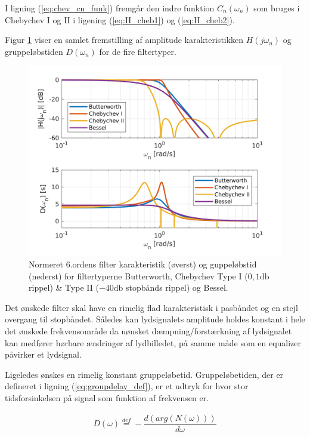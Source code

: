 I ligning (\ref{eq:chev_cn_funk}) fremgår den indre funktion $C_n(\omega_n)$ som bruges i Chebychev I og II i ligening (\ref{eq:H_cheb1}) og (\ref{eq:H_cheb2}).

Figur \ref{fig:filter_typer} viser en samlet fremstilling af amplitude karakteristikken $H(j\omega_n)$ og gruppeløbstiden $D(\omega_n)$ for de fire filtertyper.

\begin{figure}[h!]
	\centering
	\includegraphics[width=1\textwidth]{matlab/filter_compare.png}
	\caption{Normeret 6.ordens filter karakteristik (øverst) og guppeløbstid (nederst) for filtertyperne Butterworth, Chebychev Type I ($0,1 \si{\decibel}$ rippel) \& Type II ($-40 \si{\decibel}$ stopbånds rippel) og Bessel.}
	\label{fig:filter_typer}
\end{figure}

Det ønskede filter skal have en rimelig flad karakteristisk i pasbåndet og en stejl overgang til stopbåndet.
Således kan lydsignalets amplitude holdes konstant i hele det ønskede frekvensområde da uønsket dæmpning/forstærkning af lydsignalet kan medfører hørbare ændringer af lydbilledet, på samme måde som en equalizer påvirker et lydsignal. 

Ligeledes ønskes en rimelig konstant gruppeløbetid. 
Gruppeløbetiden, der er defineret i ligning (\ref{eq:groupdelay_def})\cite{anfilter}, er et udtryk for hvor stor tidsforsinkelsen på signal som funktion af frekvensen er.

\begin{align}
	D(\omega) \stackrel{def}{=} - \dfrac{d(arg(N(\omega)))}{d\omega}\label{eq:groupdelay_def}
\end{align}

